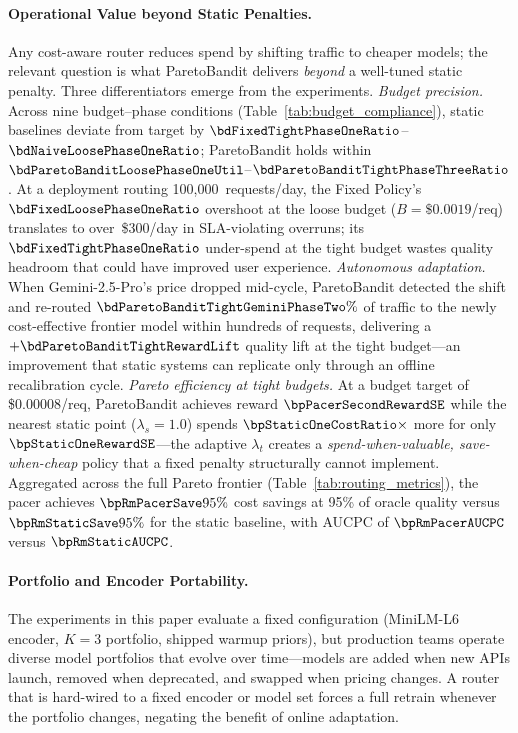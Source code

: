 \paragraph{Operational Value beyond Static Penalties.}
Any cost-aware router reduces spend by shifting traffic to cheaper models; the relevant question is what ParetoBandit delivers \emph{beyond} a well-tuned static penalty.  Three differentiators emerge from the experiments.
%
\emph{Budget precision.}
Across nine budget--phase conditions (Table~\ref{tab:budget_compliance}), static baselines deviate from target by $\bdFixedTightPhaseOneRatio$--$\bdNaiveLoosePhaseOneRatio$; ParetoBandit holds within $\bdParetoBanditLoosePhaseOneUtil$--$\bdParetoBanditTightPhaseThreeRatio$.
At a deployment routing 100{,}000~requests/day, the Fixed Policy's $\bdFixedLoosePhaseOneRatio$ overshoot at the loose budget ($B{=}\$0.0019$/req) translates to over~\$300/day in SLA-violating overruns; its $\bdFixedTightPhaseOneRatio$ under-spend at the tight budget wastes quality headroom that could have improved user experience.
%
\emph{Autonomous adaptation.}
When Gemini-2.5-Pro's price dropped mid-cycle, ParetoBandit detected the shift and re-routed $\bdParetoBanditTightGeminiPhaseTwo\%$ of traffic to the newly cost-effective frontier model within hundreds of requests, delivering a $+\bdParetoBanditTightRewardLift$ quality lift at the tight budget---an improvement that static systems can replicate only through an offline recalibration cycle.
%
\emph{Pareto efficiency at tight budgets.}
At a budget target of \$0.00008/req, ParetoBandit achieves reward $\bpPacerSecondRewardSE$ while the nearest static point ($\lambda_s{=}1.0$) spends $\bpStaticOneCostRatio\times$ more for only $\bpStaticOneRewardSE$---the adaptive $\lambda_t$ creates a \emph{spend-when-valuable, save-when-cheap} policy that a fixed penalty structurally cannot implement.
Aggregated across the full Pareto frontier (Table~\ref{tab:routing_metrics}), the pacer achieves $\bpRmPacerSave95\%$ cost savings at 95\% of oracle quality versus $\bpRmStaticSave95\%$ for the static baseline, with AUCPC of $\bpRmPacerAUCPC$ versus $\bpRmStaticAUCPC$.

\paragraph{Portfolio and Encoder Portability.}
The experiments in this paper evaluate a fixed configuration (MiniLM-L6 encoder, $K{=}3$ portfolio, shipped warmup priors), but production teams operate diverse model portfolios that evolve over time---models are added when new APIs launch, removed when deprecated, and swapped when pricing changes.
A router that is hard-wired to a fixed encoder or model set forces a full retrain whenever the portfolio changes, negating the benefit of online adaptation.

